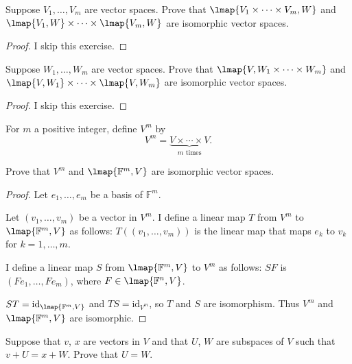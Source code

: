 \begin{exercise}
    Suppose $V_{1} , \ldots, V_{m}$ are vector spaces. Prove that $\lmap{V_{1} \times \cdots\times V_{m} , W}$ and $\lmap{V_{1} , W} \times \cdots \times \lmap{V_{m} , W}$ are isomorphic vector spaces.
\end{exercise}

\begin{proof}
    I skip this exercise.
\end{proof}
\newpage

\begin{exercise}
    Suppose $W_{1} , \ldots, W_{m}$ are vector spaces. Prove that $\lmap{V, W_{1} \times \cdots \times W_{m}}$ and $\lmap{V, W_{1}} \times \cdots \times \lmap{V, W_{m}}$ are isomorphic vector spaces.
\end{exercise}

\begin{proof}
    I skip this exercise.
\end{proof}
\newpage

\begin{exercise}
    For $m$ a positive integer, define $V^{m}$ by
    \[
        V^{m} = \underbrace{V\times \cdots \times V}_{\text{$m$ times}}.
    \]

    Prove that $V^{m}$ and $\lmap{\mathbb{F}^{m}, V}$ are isomorphic vector spaces.
\end{exercise}

\begin{proof}
    Let $e_{1}, \ldots, e_{m}$ be a basis of $\mathbb{F}^{m}$.

    Let $(v_{1}, \ldots, v_{m})$ be a vector in $V^{m}$. I define a linear map $T$ from $V^{m}$ to $\lmap{\mathbb{F}^{m}, V}$ as follows: $T((v_{1}, \ldots, v_{m}))$ is the linear map that maps $e_{k}$ to $v_{k}$ for $k = 1,\ldots, m$.

    I define a linear map $S$ from $\lmap{\mathbb{F}^{m}, V}$ to $V^{m}$ as follows: $SF$ is $(Fe_{1}, \ldots, Fe_{m})$, where $F\in\lmap{\mathbb{F}^{n}, V}$.

    $ST = \text{id}_{\lmap{\mathbb{F}^{m}, V}}$ and $TS = \text{id}_{V^{m}}$, so $T$ and $S$ are isomorphism. Thus $V^{m}$ and $\lmap{\mathbb{F}^{m}, V}$ are isomorphic.
\end{proof}
\newpage

\begin{exercise}
    Suppose that $v$, $x$ are vectors in $V$ and that $U$, $W$ are subspaces of $V$ such that $v + U = x + W$. Prove that $U = W$.
\end{exercise}

